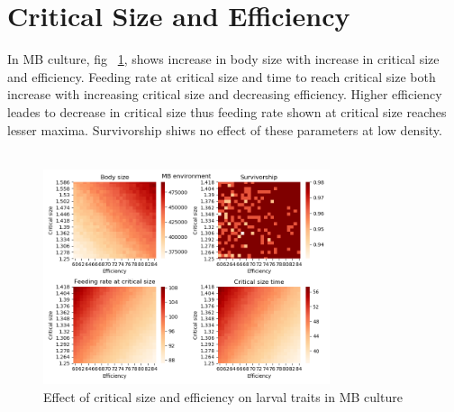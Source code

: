 \section{Critical Size and Efficiency}
In MB culture, fig ~\ref{fig:cs vs eff mb}, shows increase in body size with increase in critical size and efficiency. Feeding rate at critical size and time to reach critical size both increase with increasing critical size and decreasing efficiency. Higher efficiency leades to decrease in critical size thus feeding rate shown at critical size reaches lesser maxima. Survivorship shiws no effect of these parameters at low density.\\ \\
\begin{figure}[ht]
  \centering
  \includegraphics[width=0.75\textwidth]{C3/Figs/Critical_size_vs_Efficiency_MB}
  \caption{Effect of critical size and efficiency on larval traits in MB culture}
  \label{fig:cs vs eff mb}
\end{figure}\\
